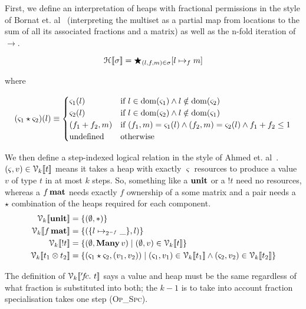 First, we define an interpretation of heaps with fractional permissions in the
style of Bornat et. al~\cite{bornat} (interpreting the multiset as a partial
map from locations to the sum of all its associated fractions and a matrix) as
well as the n-fold iteration of $\rightarrow$.

\vspace{-\baselineskip}
\[
    \mathcal{H}_{} [\![ \sigma ]\!] = \bigstar_{(l,f,m) \in \sigma} [l \mapsto_f m]
\]

where

\vspace{-\baselineskip}
\[
    (\varsigma_1 \star \varsigma_2)(l) \equiv
    \begin{cases}
        \varsigma_1(l) & \textrm{if } l \in \mathrm{dom}(\varsigma_1) \wedge l \notin \mathrm{dom}(\varsigma_2) \\
        \varsigma_2(l) & \textrm{if } l \in \mathrm{dom}(\varsigma_2) \wedge l \notin \mathrm{dom}(\varsigma_1) \\
        (f_1 + f_2, m) & \textrm{if } (f_1, m) = \varsigma_1(l) \wedge (f_2, m) = \varsigma_2(l) \wedge f_1 + f_2 \leq 1 \\
        \textrm{undefined} & \textrm{otherwise}
    \end{cases}
\]

We then define a step-indexed logical relation in the style of Ahmed et.
al~\cite{ahmed20073}. $(\varsigma, v) \in \mathcal{V}_{k} [\![ t ]\!]$ means it takes a heap with
exactly $\varsigma$ resources to produce a value $v$ of type $t$ in at most $k$
steps. So, something like a $\mathbf{unit}$ or a $!t$ need no resources, whereas
a $f\, \mathbf{mat}$ needs exactly $f$ ownership of a some matrix and a pair
needs a $\star$ combination of the heaps required for each component.
\begin{align*}
  \V{k}{ \Unit } &= \{ (\empH, \ast) \} \\
  \V{k}{ f \, \Mat } &= \{ (\{ l \mapsto_{2^{-f}} \_ \} , l) \} \\
  \V{k}{ \Bang t } &= \{ (\empH, \Many\, v) \mid (\empH, v) \in \V{k}{t} \} \\
  \V{k}{ t_1 \otimes t_2 } &= \{ (\varsigma_1 \star \varsigma_2, ( v_1, v_2 )) \mid (\varsigma_1, v_1) \in \V{k}{t_1} \wedge (\varsigma_2, v_2) \in \V{k}{t_2} \}
\end{align*}

The definition of $\V{k}{ '\!f\!c.\ t}$ says a value and heap
must be the same regardless of what fraction is substituted into both; the
$k-1$ is to take into account fraction specialisation takes one step
(\textsc{Op\_Spc}).

